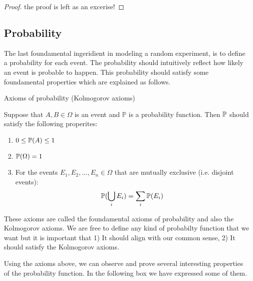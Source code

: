 \begin{proof}
the proof is left as an excerise!
\end{proof}


\subsection{Probability}

The last foundamental ingeridient in modeling a random experiment, is to define a probability for each event. The probability should intuitively reflect how likely an event is probable to happen. This probability should satisfy some foundamental properties which are explained as follows.

 \begin{axiombox}{Axioms of probability (Kolmogorov axioms)}

Suppose that $A, B \in \Omega$ is an event and $\mathbb{P}$ is a probability function. Then $\mathbb{P}$ should satisfy the following properites:

\begin{enumerate}

\item $ 0 \leq \mathbb{P}(A) \leq 1$
\item $\mathbb{P}(\Omega) = 1$
\item For the events $E_1, E_2, ..., E_n \in \Omega$ that are mutually exclusive (i.e. disjoint events): $$\mathbb{P}(\bigcup_{i} E_i) = \sum_i \mathbb{P}(E_i)$$
\end{enumerate}


\end{axiombox}



These axioms are called the foundamental axioms of probability and also the Kolmogorov axioms. We are free to define any kind of probabilty function that we want but it is important that 1) It should align with our common sense, 2) It should satisfy the Kolmogorov axioms. 

Using the axioms above, we can observe and prove several interesting properties of the probability function. In the following box we have expressed some of them.

